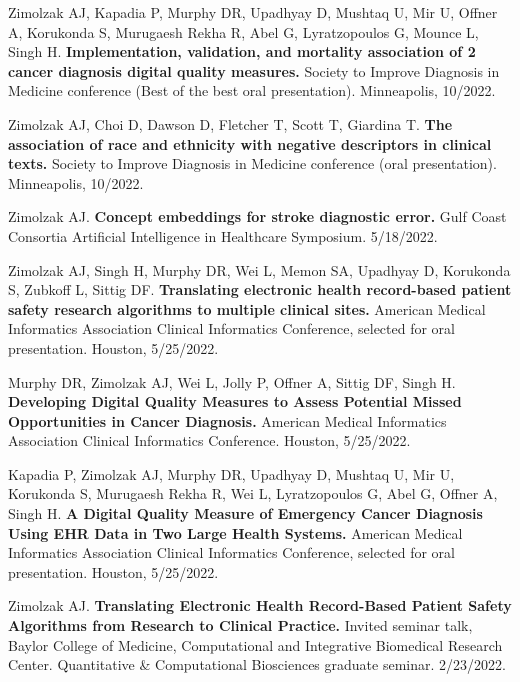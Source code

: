 \documentclass[10pt]{article}
\begin{document}
Zimolzak AJ, Kapadia P, Murphy DR, Upadhyay D, Mushtaq U, Mir U,
Offner A, Korukonda S, Murugaesh Rekha R, Abel G, Lyratzopoulos G,
Mounce L, Singh H. \textbf{Implementation, validation, and mortality
  association of 2 cancer diagnosis digital quality measures.} Society
to Improve Diagnosis in Medicine conference (Best of the best oral
presentation). Minneapolis, 10/2022.

Zimolzak AJ, Choi D, Dawson D, Fletcher T, Scott T, Giardina T.
\textbf{The association of race and ethnicity with negative
  descriptors in clinical texts.} Society to Improve Diagnosis in
Medicine conference (oral presentation). Minneapolis, 10/2022.


Zimolzak AJ. \textbf{Concept embeddings for stroke diagnostic error.}
Gulf Coast Consortia Artificial Intelligence in Healthcare Symposium.
5/18/2022.


Zimolzak AJ, Singh H, Murphy DR, Wei L, Memon SA, Upadhyay D,
Korukonda S, Zubkoff L, Sittig DF. \textbf{Translating electronic
  health record-based patient safety research algorithms to multiple
  clinical sites.} American Medical Informatics Association Clinical
Informatics Conference, selected for oral presentation. Houston,
5/25/2022.

Murphy DR, Zimolzak AJ, Wei L, Jolly P, Offner A, Sittig DF, Singh H.
\textbf{Developing Digital Quality Measures to Assess Potential Missed
  Opportunities in Cancer Diagnosis.} American Medical Informatics
Association Clinical Informatics Conference. Houston, 5/25/2022.

Kapadia P, Zimolzak AJ, Murphy DR, Upadhyay D, Mushtaq U, Mir U,
Korukonda S, Murugaesh Rekha R, Wei L, Lyratzopoulos G, Abel G, Offner
A, Singh H. \textbf{A Digital Quality Measure of Emergency Cancer
  Diagnosis Using EHR Data in Two Large Health Systems.} American
Medical Informatics Association Clinical Informatics Conference,
selected for oral presentation. Houston, 5/25/2022.


Zimolzak AJ. \textbf{Translating Electronic Health Record-Based
  Patient Safety Algorithms from Research to Clinical Practice.}
Invited seminar talk, Baylor College of Medicine, Computational and
Integrative Biomedical Research Center. Quantitative \& Computational
Biosciences graduate seminar. 2/23/2022.

\end{document}
